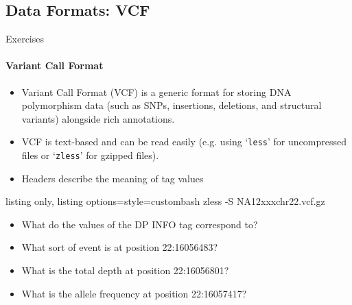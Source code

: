 \documentclass{beamer}
\begin{document}
\subsection{Data Formats: VCF}
\begin{frame}[fragile]{Exercises}
\framesubtitle{Variant Call Format}
\begin{itemize}
\item Variant Call Format (VCF) is a generic format for storing DNA polymorphism data (such as SNPs, insertions, deletions, and structural variants) alongside rich annotations.
\item VCF is text-based and can be read easily (e.g. using `\texttt{less}' for uncompressed files or `\texttt{zless}' for gzipped files). 
\item Headers describe the meaning of tag values
\end{itemize}
\begin{tcblisting}{listing only, listing options={style=custombash}}
zless -S NA12xxxchr22.vcf.gz
\end{tcblisting}
\begin{itemize}
\item What do the values of the DP INFO tag correspond to?
\item What sort of event is at position 22:16056483?
\item What is the total depth at position 22:16056801?
\item What is the allele frequency at position 22:16057417?
\end{itemize}
\end{frame}
\end{document}
